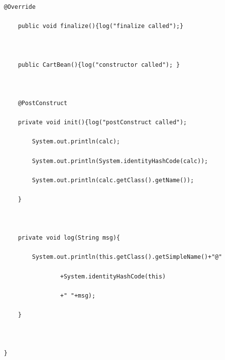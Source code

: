 \documentclass[a4paper,10pt]{scrreprt}
\begin{document}
\begin{lstlisting}[caption=Stateful Bean]
	@Override

	public void finalize(){log("finalize called");}



	public CartBean(){log("constructor called"); }



	@PostConstruct

	private void init(){log("postConstruct called");

		System.out.println(calc);

		System.out.println(System.identityHashCode(calc));

		System.out.println(calc.getClass().getName());

	}



	private void log(String msg){

		System.out.println(this.getClass().getSimpleName()+"@"

				+System.identityHashCode(this)

				+" "+msg);

	}

	

}
\end{lstlisting}
\end{document}
